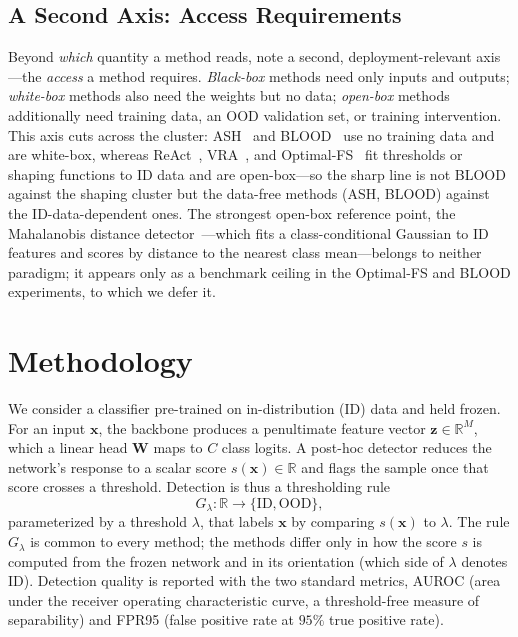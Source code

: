 \documentclass[a4paper]{article}
\begin{document}
\subsection{A Second Axis: Access Requirements}
\label{subsec:access}

Beyond \emph{which} quantity a method reads, \citet{blood} note a second,
deployment-relevant axis---the \emph{access} a method requires. \emph{Black-box}
methods need only inputs and outputs; \emph{white-box} methods also need the weights
but no data; \emph{open-box} methods additionally need training data, an OOD
validation set, or training intervention. This axis cuts across the cluster:
ASH~\cite{ash} and BLOOD~\cite{blood} use no training data and are white-box, whereas
ReAct~\cite{react}, VRA~\cite{vra}, and Optimal-FS~\cite{opt} fit thresholds or
shaping functions to ID data and are open-box---so the sharp line is not BLOOD
against the shaping cluster but the data-free methods (ASH, BLOOD) against the
ID-data-dependent ones. The strongest open-box reference point, the Mahalanobis
distance detector~\cite{mahalanobis}---which fits a class-conditional Gaussian to ID
features and scores by distance to the nearest class mean---belongs to neither
paradigm; it appears only as a benchmark ceiling in the Optimal-FS and BLOOD
experiments, to which we defer it.

\section{Methodology}
\label{sec:methodology}

We consider a classifier pre-trained on in-distribution (ID) data and held frozen.
For an input $\mathbf{x}$, the backbone produces a penultimate feature vector
$\mathbf{z} \in \mathbb{R}^{M}$, which a linear head $\mathbf{W}$ maps to $C$ class
logits. A post-hoc detector reduces the network's response to a scalar score
$s(\mathbf{x}) \in \mathbb{R}$ and flags the sample once that score crosses a
threshold. Detection is thus a thresholding rule
\begin{equation}
G_\lambda : \mathbb{R} \to \{\text{ID}, \text{OOD}\},
\end{equation}
parameterized by a threshold $\lambda$, that labels $\mathbf{x}$ by comparing
$s(\mathbf{x})$ to $\lambda$. The rule $G_\lambda$ is common to every method; the
methods differ only in how the score $s$ is computed from the frozen network and in
its orientation (which side of $\lambda$ denotes ID). Detection quality is reported
with the two standard metrics, AUROC (area under the receiver operating characteristic
curve, a threshold-free measure of separability) and FPR95 (false positive rate at
$95\%$ true positive rate).
\end{document}
